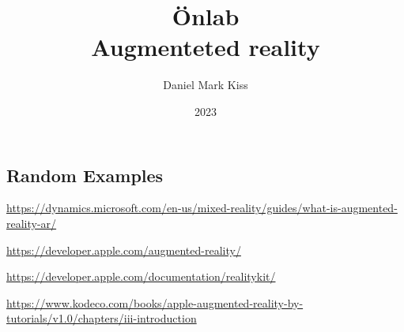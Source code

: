 \documentclass{report}
\title{\Huge{Önlab}\\Augmenteted reality}
\author{\huge{Daniel Mark Kiss}}
\date{2023}
\begin{document}
\maketitle
\newpage
\tableofcontents
\pagebreak

\chapter{}
\section{Random Examples}

\hyperlink{https://dynamics.microsoft.com/en-us/mixed-reality/guides/what-is-augmented-reality-ar/}{https://dynamics.microsoft.com/en-us/mixed-reality/guides/what-is-augmented-reality-ar/}

\hyperlink{https://developer.apple.com/augmented-reality/}{https://developer.apple.com/augmented-reality/}

\hyperlink{https://developer.apple.com/documentation/realitykit/}{https://developer.apple.com/documentation/realitykit/}

\hyperlink{https://www.kodeco.com/books/apple-augmented-reality-by-tutorials/v1.0/chapters/iii-introduction}{https://www.kodeco.com/books/apple-augmented-reality-by-tutorials/v1.0/chapters/iii-introduction}
\end{document}

